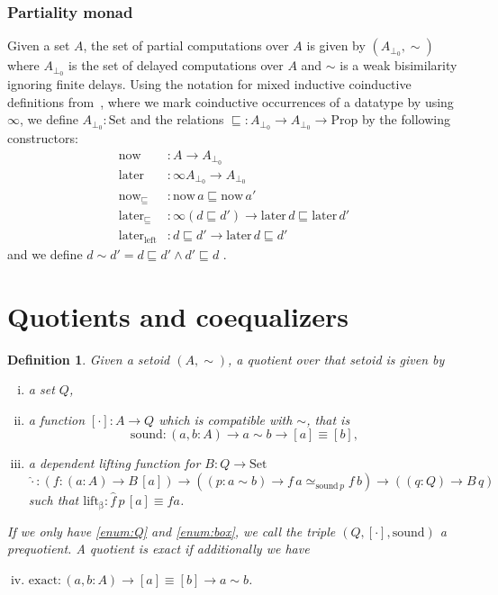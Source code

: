 \documentclass[preprint,12pt]{elsarticle}
\newtheorem{definition}{Definition}[section]
\newcommand{\prop}{\mathrm{Prop}}
\newcommand{\bocks}[1]{[#1]}
\newcommand{\lift}[1]{\widehat{#1}}
\newcommand{\sound}{\mathrm{sound}}
\newcommand{\liftok}{\mathrm{lift_\beta}}
\newcommand{\exact}{\mathrm{exact}}
\newcommand{\Set}{\mathrm{Set}}
\newcommand{\now}{\mathrm{now}}
\newcommand{\later}{\mathrm{later}}
\newcommand{\noweq}{\mathrm{now}_\sqsubseteq}
\newcommand{\latereq}{\mathrm{later}_\sqsubseteq}
\newcommand{\laterleft}{\mathrm{later}_{\mathrm{left}}}
\begin{document}
\subsubsection*{Partiality monad}
Given a set $A$, the set of partial computations over $A$ is given by $(A_{\bot_0},{\sim})$ where $A_{\bot_0}$ is the set of delayed computations over $A$  and $\sim$ is a weak bisimilarity ignoring finite delays. Using the notation for mixed inductive coinductive  definitions from~\cite{danielson:altenkirch:2010}, where we mark coinductive occurrences of a datatype by using $\infty$, we define $A_{\bot_0} : \Set$ and the relations $\sqsubseteq:A_{\bot_0}\to A_{\bot_0} \to \prop$ by the following constructors:
\begin{align*}
\now  &: A \to A_{\bot_0}\\
\later &: \infty A_{\bot_0} \to  A_{\bot_0}\\
\noweq &: \now\, a \sqsubseteq \now\,a'\\
\latereq &: \infty(d \sqsubseteq d') \to \later\,d \sqsubseteq \later\,d'\\
\laterleft &: d\sqsubseteq d' \to \later\,d \sqsubseteq d'
\end{align*}
and we define $d\sim d'= d\sqsubseteq d' \wedge d'\sqsubseteq d$ .

\section{Quotients and coequalizers}\label{sec:quotients}
 
\begin{definition}
\label{def:quotient}
Given a setoid $(A,\sim)$,  a \emph{quotient} over that setoid is given by

\begin{enumerate}[i.]
\item \label{enum:Q} a set $Q$,
\item \label{enum:box}a function $\bocks\cdot\colon A \to Q$ which is compatible with $\sim$, 
that is \[\sound\colon (a,b : A) \to a\sim b \to [a] \equiv [b],\]
\item \label{enum:dlift} a dependent lifting function for $B:Q\to\Set$
 \[\lift\cdot: (f\colon (a:A) \to B\,\bocks a) \to ((p:a\sim b) \to f\,a \simeq_{\sound\,p}f\,b) 
      \to ((q:Q) \to B\,q) \]
such that $\liftok\colon \lift f \,p\,\bocks a\equiv f a$.
 
\end{enumerate}
If we only have \ref{enum:Q} and \ref{enum:box}, we call the triple $(Q,\bocks\cdot, \sound)$ a \emph{prequotient}.
A quotient is \emph{exact} if additionally
we have 
\begin{enumerate}[i.]
\setcounter{enumi}{3}
\item $\exact :(a,b : A) \to  \bocks a \equiv \bocks b \to a \sim b$.

\end{enumerate}
\end{definition}
\end{document}
